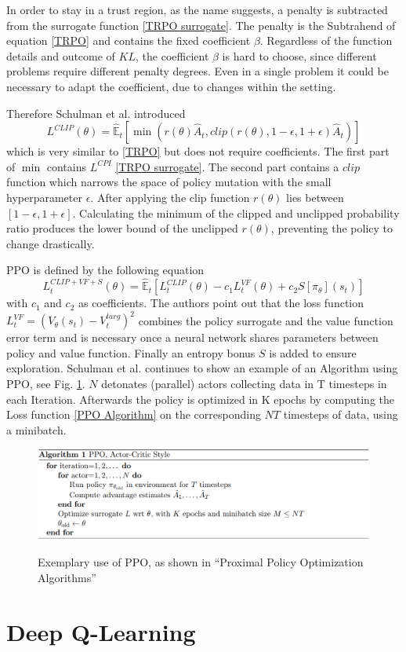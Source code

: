 In order to stay in a trust region, as the name suggests, a penalty is subtracted from the
surrogate function \eqref{TRPO surrogate}.
The penalty is the Subtrahend of equation \eqref{TRPO} and contains the fixed coefficient $\beta$.
Regardless of the function details and outcome of $KL$, the coefficient $\beta$
is hard to choose, since different problems require different penalty degrees. Even in a single problem
it could be necessary to adapt the coefficient, due to changes within the setting.

Therefore Schulman et al. introduced
\begin{equation}\label{PPO}
    L^{CLIP}(\theta) = \hat{\mathbb{E}}_{t}[\min(r(\theta)\hat{A}_{t},clip(r(\theta), 1-\epsilon, 1+\epsilon)\hat{A}_{t})]
\end{equation}
which is very similar to \eqref{TRPO} but does not require coefficients.
The first part of $\min$ contains $L^{CPI}$ \eqref{TRPO surrogate}.
The second part contains a $clip$ function which narrows the space of policy mutation with
the small hyperparameter $\epsilon$. After applying the clip function $r(\theta)$ lies between
$[1-\epsilon,1+\epsilon]$. Calculating the minimum of the clipped and unclipped probability ratio
produces the lower bound of the unclipped $r(\theta)$, preventing the policy to change drastically.

PPO is defined by the following equation
\begin{equation}\label{PPO Algorithm}
    L_{t}^{CLIP+VF+S}(\theta) = \hat{\mathbb{E}}_{t}[L_{t}^{CLIP}(\theta) - c_{1}L_{t}^{VF}(\theta) + c_{2}S[\pi_{\theta}](s_{t})]
\end{equation}
with $c_{1}$ and $c_{2}$ as coefficients. The authors point out that the loss function \\
$L_{t}^{VF} = (V_{\theta}(s_{t})-V_{t}^{targ})^2$
combines the policy surrogate and the value function error term and is
necessary once a neural network shares parameters between policy and value function.
Finally an entropy bonus $S$ is added to ensure exploration.
Schulman et al. continues to show an example of an Algorithm using PPO, see Fig. \ref{fig:ppo_algo_code}.
$N$ detonates (parallel) actors collecting data in T timesteps in each Iteration.
Afterwards the policy is optimized in K epochs by computing the Loss function \eqref{PPO Algorithm} on the
corresponding $NT$ timesteps of data, using a minibatch.
\begin{figure}[hpbt]
    \centering
    \includegraphics[width=1\textwidth]{pictures/ppo_algo_code.png}\\
    \caption[Exemplary Use Of PPO]{Exemplary use of PPO, as shown in ``Proximal Policy Optimization Algorithms''\cite{scwo17}}\label{fig:ppo_algo_code}
\end{figure}

\section{Deep Q-Learning}